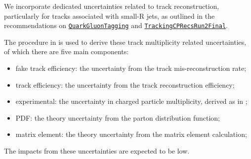 \label{subsec:tracks_uncer}

We incorporate dedicated uncertainties related to track reconstruction, particularly for tracks associated with small-R jets, as outlined in the recommendations on \mbox{\texttt{\href{https://twiki.cern.ch/twiki/bin/viewauth/AtlasProtected/QuarkGluonTagging\#Current_Recommendations}{QuarkGluonTagging}}} and \mbox{\texttt{\href{https://twiki.cern.ch/twiki/bin/view/AtlasProtected/TrackingCPRecsRun2Final\#Track_Systematics_Tools}{TrackingCPRecsRun2Final}}}. 

The procedure in \cite{ATL-PHYS-PUB-2017-009} is used to derive these track multiplicity related uncertainties, of which there are five main components:
\begin{itemize}
    \item fake track efficiency: the uncertainty from the track mis-reconstruction rate;
    \item track efficiency: the uncertainty from the track reconstruction efficiency;
    \item experimental: the uncertainty in charged particle multiplicity, derived as in \cite{CERN-PH-EP-2016-001};
    \item PDF: the theory uncertainty from the parton distribution function;
    \item matrix element: the theory uncertainty from the matrix element calculation;
\end{itemize}
The impacts from these uncertainties are expected to be low.

